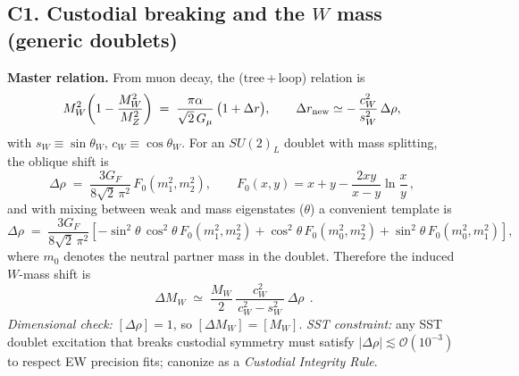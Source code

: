 \documentclass[11pt]{article}
\begin{document}
      \subsection*{C1. Custodial breaking and the $W$ mass (generic doublets)}
          \textbf{Master relation.} From muon decay, the (tree\,+\,loop) relation is
          \begin{equation}
          M_W^2\!\left(1-\frac{M_W^2}{M_Z^2}\right)
          \;=\; \frac{\pi\alpha}{\sqrt{2}\,G_\mu}\,\bigl(1+\Delta r\bigr),
          \qquad
          \Delta r_{\rm new}\simeq -\,\frac{c_W^2}{s_W^2}\,\Delta\rho,
          \label{eq:MWmaster}
          \end{equation}
          with $s_W\equiv\sin\theta_W$, $c_W\equiv\cos\theta_W$. For an $SU(2)_L$ doublet with mass splitting, the oblique shift is
          \begin{equation}
          \Delta\rho \;=\; \frac{3G_F}{8\sqrt{2}\,\pi^2}\,F_0(m_1^2,m_2^2),
          \qquad
          F_0(x,y)=x+y-\frac{2xy}{x-y}\ln\!\frac{x}{y}\,,
          \end{equation}
          and with mixing between weak and mass eigenstates ($\theta$) a convenient template is
          \begin{equation}
          \Delta\rho \;=\; \frac{3G_F}{8\sqrt{2}\,\pi^2}\!
          \left[
              -\sin^2\theta\,\cos^2\theta\,F_0(m_1^2,m_2^2)
          + \cos^2\theta\,F_0(m_0^2,m_2^2)
          + \sin^2\theta\,F_0(m_0^2,m_1^2)
          \right]\!,
          \end{equation}
          where $m_0$ denotes the neutral partner mass in the doublet.
          Therefore the induced $W$-mass shift is
          \begin{equation}
          \boxed{\;\Delta M_W \;\simeq\; \frac{M_W}{2}\,
          \frac{c_W^2}{\,c_W^2-s_W^2\,}\,\Delta\rho\;}\,.
          \end{equation}
          \textit{Dimensional check:} $[\Delta\rho]=1$, so $[\Delta M_W]=[M_W]$. \textit{SST constraint:} any SST doublet excitation that breaks custodial symmetry must satisfy $|\Delta\rho|\lesssim \mathcal O(10^{-3})$ to respect EW precision fits; canonize as a \emph{Custodial Integrity Rule}.
\end{document}
